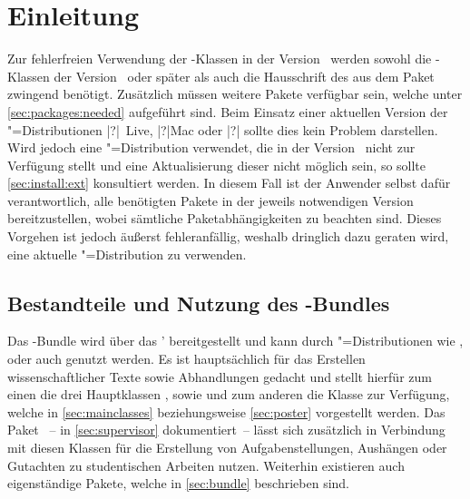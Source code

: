 \chapter{Einleitung}
%
Zur fehlerfreien Verwendung der \TUDScript-Klassen in der Version~\vTUDScript{} 
werden sowohl die \KOMAScript-Klassen der Version~\vKOMAScript{} oder später 
als auch die Hausschrift des \CDs \OpenSans aus dem Paket  
zwingend benötigt. Zusätzlich müssen weitere Pakete verfügbar sein, welche 
unter \autoref{sec:packages:needed} aufgeführt sind. Beim Einsatz einer 
aktuellen Version der "=Distributionen 
\Distribution|?|{~Live}, \Distribution|?|{Mac} oder 
\Distribution|?|{} sollte dies kein Problem darstellen. Wird 
jedoch eine "=Distribution verwendet, die \TUDScript in der 
Version~\vTUDScript{} nicht zur Verfügung stellt und eine Aktualisierung dieser 
nicht möglich sein, so sollte \autoref{sec:install:ext} konsultiert werden. In 
diesem Fall ist der Anwender selbst dafür verantwortlich, alle benötigten 
Pakete in der jeweils notwendigen Version bereitzustellen, wobei sämtliche 
Paketabhängigkeiten zu beachten sind. Dieses Vorgehen ist jedoch äußerst 
fehleranfällig, weshalb dringlich dazu geraten wird, eine aktuelle 
"=Distribution zu verwenden.



\section{Bestandteile und Nutzung des \TUDScript-Bundles}
%
%
Das \TUDScript-Bundle wird über das \CTAN' bereitgestellt und kann durch 
"=Distributionen wie , 
 oder auch  
genutzt werden. Es ist hauptsächlich für das Erstellen wissenschaftlicher 
Texte sowie Abhandlungen gedacht und stellt hierfür zum einen die drei 
Hauptklassen ,  sowie  
und zum anderen die Klasse  zur Verfügung, welche in 
\autoref{sec:mainclasses} beziehungsweise \autoref{sec:poster} vorgestellt 
werden. Das Paket ~-- in \autoref{sec:supervisor} 
dokumentiert~-- lässt sich zusätzlich in Verbindung mit diesen Klassen für die 
Erstellung von Aufgabenstellungen, Aushängen oder Gutachten zu studentischen 
Arbeiten nutzen. Weiterhin existieren auch eigenständige Pakete, welche in 
\autoref{sec:bundle} beschrieben sind. 

